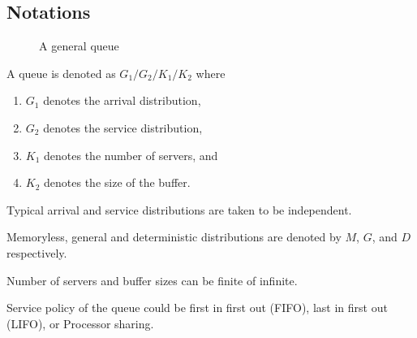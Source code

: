 \documentclass[a4paper,english,10pt]{article}
\begin{document}
\subsection{Notations}
\begin{figure}[hhhh]
	\center
	
	\caption{A general queue}
	\label{Fig:queue}
\end{figure}
A queue is denoted as $G_1/G_2/K_1/K_2$
where
\begin{enumerate}
	\item $G_1$ denotes the arrival distribution, %
	\item $G_2$ denotes the service distribution, %
	\item $K_1$ denotes the number of servers,  and%
	\item $K_2$ denotes the size of the buffer.%
\end{enumerate}
\begin{rem}
Typical arrival and service distributions are taken to be independent. 
\end{rem}
\begin{rem} Memoryless, general and deterministic distributions are denoted by $M$, $G$, and $D$ respectively. 
\end{rem}
\begin{rem}
Number of servers and buffer sizes can be finite of infinite.
\end{rem}
\begin{rem}
Service policy of the queue could be first in first out (FIFO), last in first out (LIFO), or Processor sharing. 
\end{rem}
\end{document}
